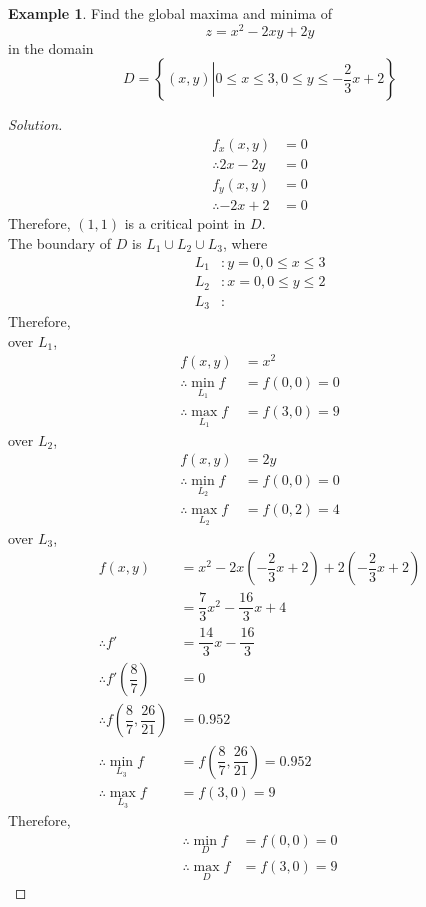\documentclass[fleqn, a4paper, 12pt]{article}
\theoremstyle{definition}
\newtheorem{example}{Example}
\theoremstyle{theorem}
\theoremstyle{remark}
\newenvironment{solution}
{\begin{proof}[Solution]\let\qed\relax}
	{\end{proof}}
\begin{document}
\begin{example}
	Find the global maxima and minima of
	\begin{equation*}
		z = x^2 - 2xy + 2y
	\end{equation*}
	in the domain
	\begin{equation*}
		D = 
		\left\lbrace
			(x,y) \left| 0 \leq x \leq 3, 0 \leq y \leq -\dfrac{2}{3} x + 2 \right.
		\right\rbrace
	\end{equation*}
\end{example}

\begin{solution}
	\begin{align*}
		f_x(x,y) &= 0\\
		\therefore 2x - 2y &= 0\\
		f_y(x,y) &= 0\\
		\therefore -2x + 2 &= 0
	\end{align*}
	Therefore, $(1,1)$ is a critical point in $D$.\\
	The boundary of $D$ is $L_1 \cup L_2 \cup L_3$, where
	\begin{align*}
		L_1 &: y = 0, 0 \leq x \leq 3\\
		L_2 &: x = 0, 0 \leq y \leq 2\\
		L_3 &:
	\end{align*}
	Therefore,\\
	over $L_1$,
	\begin{align*}
		f(x,y) &= x^2\\
		\therefore \min_{L_1} f &= f(0,0) = 0\\
		\therefore \max_{L_1} f &= f(3,0) = 9
	\end{align*}
		over $L_2$,
	\begin{align*}
		f(x,y) &= 2y\\
		\therefore \min_{L_2} f &= f(0,0) = 0\\
		\therefore \max_{L_2} f &= f(0,2) = 4
	\end{align*}
		over $L_3$,
	\begin{align*}
		f(x,y) &= x^2 - 2x \left(-\dfrac{2}{3} x + 2\right) + 2 \left(-\dfrac{2}{3} x + 2\right)\\
		&= \dfrac{7}{3} x^2 - \dfrac{16}{3} x + 4\\
		\therefore f' &= \dfrac{14}{3} x - \dfrac{16}{3}\\
		\therefore f'\left(\dfrac{8}{7}\right) &= 0\\
		\therefore f\left(\dfrac{8}{7}, \dfrac{26}{21}\right) &= 0.952\\
		\therefore \min_{L_3} f &= f\left(\dfrac{8}{7}, \dfrac{26}{21}\right) = 0.952\\
		\therefore \max_{L_3} f &= f(3,0) = 9
	\end{align*}
	Therefore,
	\begin{align*}
		\therefore \min_{D} f &= f(0,0) = 0\\
		\therefore \max_{D} f &= f(3,0) = 9
	\end{align*}
\end{solution}
\end{document}
